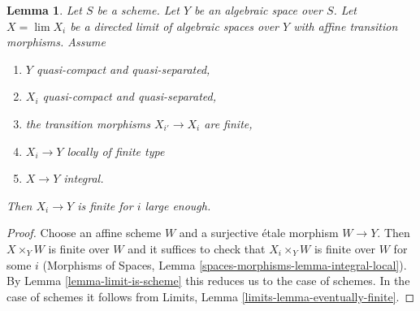 \documentclass{stacks-project}
\theoremstyle{plain}
\newtheorem{lemma}[subsection]{Lemma}
\theoremstyle{definition}
\theoremstyle{remark}
\numberwithin{equation}{subsection}
\def\lim{\mathop{\mathrm{lim}}\nolimits}
\begin{document}
\begin{lemma}
\label{lemma-eventually-finite}
Let $S$ be a scheme. Let $Y$ be an algebraic space over $S$.
Let $X = \lim X_i$ be a directed limit of algebraic spaces
over $Y$ with affine transition morphisms. Assume
\begin{enumerate}
\item $Y$ quasi-compact and quasi-separated,
\item $X_i$ quasi-compact and quasi-separated,
\item the transition morphisms $X_{i'} \to X_i$ are finite,
\item $X_i \to Y$ locally of finite type
\item $X \to Y$ integral.
\end{enumerate}
Then $X_i \to Y$ is finite for $i$ large enough.
\end{lemma}

\begin{proof}
Choose an affine scheme $W$ and a surjective \'etale morphism $W \to Y$.
Then $X \times_Y W$ is finite over $W$ and it suffices to check that
$X_i \times_Y W$ is finite over $W$ for some $i$ (Morphisms of Spaces,
Lemma \ref{spaces-morphisms-lemma-integral-local}). By
Lemma \ref{lemma-limit-is-scheme} this reduces us to the case of schemes.
In the case of schemes it follows from
Limits, Lemma \ref{limits-lemma-eventually-finite}.
\end{proof}
\end{document}
